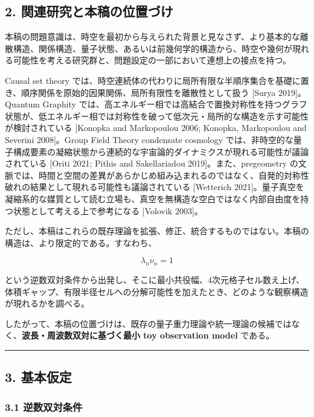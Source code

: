 \documentclass[
]{ltjsarticle}
\begin{document}
\subsection{2.
関連研究と本稿の位置づけ}\label{ux95a2ux9023ux7814ux7a76ux3068ux672cux7a3fux306eux4f4dux7f6eux3065ux3051}

本稿の問題意識は、時空を最初から与えられた背景と見なさず、より基本的な離散構造、関係構造、量子状態、あるいは前幾何学的構造から、時空や幾何が現れる可能性を考える研究群と、問題設定の一部において連想上の接点を持つ。

Causal set theory
では、時空連続体の代わりに局所有限な半順序集合を基礎に置き、順序関係を原始的因果関係、局所有限性を離散性として扱う
{[}Surya 2019{]}。Quantum Graphity
では、高エネルギー相では高結合で置換対称性を持つグラフ状態が、低エネルギー相では対称性を破って低次元・局所的な構造を示す可能性が検討されている
{[}Konopka and Markopoulou 2006; Konopka, Markopoulou and Severini
2008{]}。Group Field Theory condensate cosmology
では、非時空的な量子構成要素の凝縮状態から連続的な宇宙論的ダイナミクスが現れる可能性が議論されている
{[}Oriti 2021; Pithis and Sakellariadou 2019{]}。また、pregeometry
の文脈では、時間と空間の差異があらかじめ組み込まれるのではなく、自発的対称性破れの結果として現れる可能性も議論されている
{[}Wetterich
2021{]}。量子真空を凝縮系的な媒質として読む立場も、真空を無構造な空白ではなく内部自由度を持つ状態として考える上で参考になる
{[}Volovik 2003{]}。

ただし、本稿はこれらの既存理論を拡張、修正、統合するものではない。本稿の構造は、より限定的である。すなわち、

\[
\lambda_n\nu_n=1
\]

という逆数双対条件から出発し、そこに最小共役幅、4次元格子セル数え上げ、体積ギャップ、有限半径セルへの分解可能性を加えたとき、どのような観察構造が現れるかを調べる。

したがって、本稿の位置づけは、既存の量子重力理論や統一理論の候補ではなく、\textbf{波長・周波数双対に基づく最小
toy observation model} である。

\begin{center}\rule{0.5\linewidth}{0.5pt}\end{center}

\subsection{3. 基本仮定}\label{ux57faux672cux4eeeux5b9a}

\subsubsection{3.1
逆数双対条件}\label{ux9006ux6570ux53ccux5bfeux6761ux4ef6}
\end{document}
